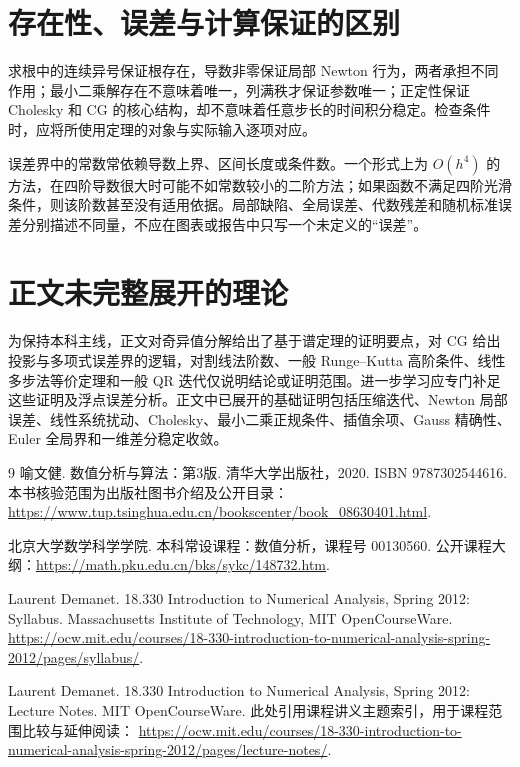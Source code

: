 \documentclass[UTF8,12pt,a4paper,fontset=fandol]{ctexbook}
\begin{document}
\section{存在性、误差与计算保证的区别}
求根中的连续异号保证根存在，导数非零保证局部 Newton 行为，两者承担不同作用；最小二乘解存在不意味着唯一，列满秩才保证参数唯一；正定性保证 Cholesky 和 CG 的核心结构，却不意味着任意步长的时间积分稳定。检查条件时，应将所使用定理的对象与实际输入逐项对应。

误差界中的常数常依赖导数上界、区间长度或条件数。一个形式上为 $O(h^4)$ 的方法，在四阶导数很大时可能不如常数较小的二阶方法；如果函数不满足四阶光滑条件，则该阶数甚至没有适用依据。局部缺陷、全局误差、代数残差和随机标准误差分别描述不同量，不应在图表或报告中只写一个未定义的“误差”。

\section{正文未完整展开的理论}
为保持本科主线，正文对奇异值分解给出了基于谱定理的证明要点，对 CG 给出投影与多项式误差界的逻辑，对割线法阶数、一般 Runge--Kutta 高阶条件、线性多步法等价定理和一般 QR 迭代仅说明结论或证明范围。进一步学习应专门补足这些证明及浮点误差分析。正文中已展开的基础证明包括压缩迭代、Newton 局部误差、线性系统扰动、Cholesky、最小二乘正规条件、插值余项、Gauss 精确性、Euler 全局界和一维差分稳定收敛。

\begin{thebibliography}{9}
喻文健. 数值分析与算法：第3版. 清华大学出版社，2020.
ISBN 9787302544616.
本书核验范围为出版社图书介绍及公开目录：
\url{https://www.tup.tsinghua.edu.cn/bookscenter/book_08630401.html}.

北京大学数学科学学院. 本科常设课程：数值分析，课程号 00130560.
公开课程大纲：\url{https://math.pku.edu.cn/bks/sykc/148732.htm}.

Laurent Demanet. 18.330 Introduction to Numerical Analysis, Spring 2012: Syllabus.
Massachusetts Institute of Technology, MIT OpenCourseWare.
\url{https://ocw.mit.edu/courses/18-330-introduction-to-numerical-analysis-spring-2012/pages/syllabus/}.

Laurent Demanet. 18.330 Introduction to Numerical Analysis, Spring 2012: Lecture Notes.
MIT OpenCourseWare. 此处引用课程讲义主题索引，用于课程范围比较与延伸阅读：
\url{https://ocw.mit.edu/courses/18-330-introduction-to-numerical-analysis-spring-2012/pages/lecture-notes/}.
\end{thebibliography}

\end{document}
